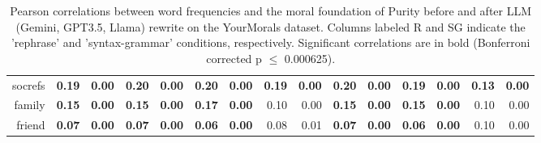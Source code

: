\begin{table}[ht]
{\begin{tabular}{rrr|rrrrrr|rrrrrr}
  socrefs & \bf{0.19} & \bf{0.00} & \bf{0.20} & \bf{0.00} & \bf{0.20} & \bf{0.00} & \bf{0.19} & \bf{0.00} & \bf{0.20} & \bf{0.00} & \bf{0.19} & \bf{0.00} & \bf{0.13} & \bf{0.00} \\ 
  family & \bf{0.15} & \bf{0.00} & \bf{0.15} & \bf{0.00} & \bf{0.17} & \bf{0.00} & 0.10 & 0.00 & \bf{0.15} & \bf{0.00} & \bf{0.15} & \bf{0.00} & 0.10 & 0.00 \\ 
  friend & \bf{0.07} & \bf{0.00} & \bf{0.07} & \bf{0.00} & \bf{0.06} & \bf{0.00} & 0.08 & 0.01 & \bf{0.07} & \bf{0.00} & \bf{0.06} & \bf{0.00} & 0.10 & 0.00 \\ 
   \hline
\end{tabular}}
\caption{Pearson correlations between word frequencies and the moral foundation of Purity before and after LLM (Gemini, GPT3.5, Llama) rewrite on the YourMorals dataset. Columns labeled R and SG indicate the ’rephrase’ and ’syntax-grammar’
conditions, respectively. Significant correlations are in bold (Bonferroni corrected p $\leq$ 0.000625).} 
\end{table}
